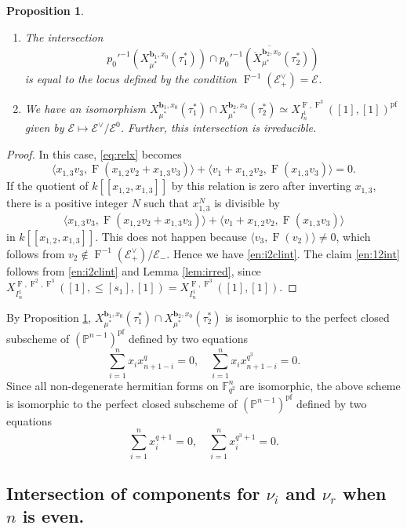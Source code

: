 \documentclass[12pt,a4paper]{article}
\newtheorem{prop}[thm]{Proposition}
\DeclareMathOperator{\oF}{F}
\newcommand{\bF}{\mathbb{F}}
\newcommand{\bP}{\mathbb{P}}
\newcommand{\bfb}{\mathbf{b}}
\newcommand{\cE}{\mathcal{E}}
\newcommand{\ol}{\overline}
\begin{document}
\begin{prop}\label{prop:inti2}
\begin{enumerate}
\item\label{en:i2clint}
The intersection 
\[
 p_0'^{-1}(X_{\mu^*}^{\bfb_{1},x_0}(\tau_{1}^*)) \cap 
\ol{p_0'^{-1}(\mathring{X}_{\mu^*}^{\bfb_2,x_0}(\tau_2^*))} 
\]
is equal to the locus defined by 
the condition $\oF^{-1}(\cE_+^{\vee}) = \cE$. 
\item\label{en:12int}
We have an isomorphism 
$X_{\mu^*}^{\bfb_1,x_0}(\tau_1^*) \cap X_{\mu^*}^{\bfb_2,x_0}(\tau_2^*) \simeq X_{I_{n}^1}^{\oF,\oF^3}([1],[1])^{\mathrm{pf}}$ 
given by 
$\cE \mapsto \cE^{\vee}/ \cE^0$. Further, this intersection is irreducible. 
\end{enumerate}
\end{prop}
\begin{proof}
In this case, 
\eqref{eq:relx} becomes 
\[
 \langle x_{1,3} v_3, \oF (x_{1,2} v_2 +x_{1,3} v_3) \rangle + 
 \langle v_1 +x_{1,2} v_2, \oF ( x_{1,3} v_3 ) 
 \rangle =0. 
\]
If the quotient of 
$k[[x_{1,2},x_{1,3}]]$ 
by this relation is zero after inverting $x_{1,3}$, 
there is a positive integer $N$ such that 
$x_{1,3}^N$ is divisible by 
\[
 \langle x_{1,3} v_3, \oF (x_{1,2} v_2 +x_{1,3} v_3) \rangle + 
 \langle v_1 +x_{1,2} v_2, \oF ( x_{1,3} v_3 ) 
 \rangle 
\]
in $k[[x_{1,2},x_{1,3}]]$. 
This does not happen because 
$\langle v_3, \oF (v_2 ) \rangle \neq 0$, which follows from $v_2 \notin \oF^{-1}(\cE_+^{\vee})/\cE_-$. 
Hence we have \ref{en:i2clint}. 
The claim \ref{en:12int} follows from 
\ref{en:i2clint} and Lemma \ref{lem:irred}, since $X_{I_{n}^1}^{\oF,\oF^2,\oF^3}([1],\leq [s_1],[1])=X_{I_{n}^1}^{\oF,\oF^3}([1],[1])$. 
\end{proof}

By Proposition \ref{prop:inti2}, 
$X_{\mu^*}^{\bfb_1,x_0}(\tau_1^*) \cap X_{\mu^*}^{\bfb_2,x_0}(\tau_2^*)$ 
is isomorphic to the perfect closed subscheme of $(\bP^{n-1})^{\mathrm{pf}}$ defined by two equations 
\[
 \sum_{i=1}^n x_i x_{n+1-i}^q=0, \quad 
 \sum_{i=1}^n x_i x_{n+1-i}^{q^3}=0. 
\]
Since all non-degenerate hermitian forms on $\bF_{q^2}^n$ 
are isomorphic, the above scheme is 
isomorphic to 
the perfect closed subscheme of $(\bP^{n-1})^{\mathrm{pf}}$ defined by two equations 
\[
 \sum_{i=1}^n x_i^{q+1}=0, \quad 
 \sum_{i=1}^n x_i^{q^3+1}=0. 
\]

\subsection{Intersection of components for $\nu_i$ and $\nu_r$ when $n$ is even.} 
\end{document}
